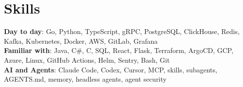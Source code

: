 \documentclass[letterpaper,11pt]{article}
\begin{document}
\section{Skills}
\begin{itemize}[leftmargin=0.15in, label={}]
    \small{\item{
          \textbf{Day to day}{: Go, Python, TypeScript, gRPC, PostgreSQL, ClickHouse, Redis, Kafka, Kubernetes, Docker, AWS, GitLab, Grafana} \\
          \textbf{Familiar with}{: Java, C\#, C, SQL, React, Flask, Terraform, ArgoCD, GCP, Azure, Linux, GitHub Actions, Helm, Sentry, Bash, Git} \\
          \textbf{AI and Agents}{: Claude Code, Codex, Cursor, MCP, skills, subagents, AGENTS.md, memory, headless agents, agent security}
          }}
\end{itemize}

\end{document}
